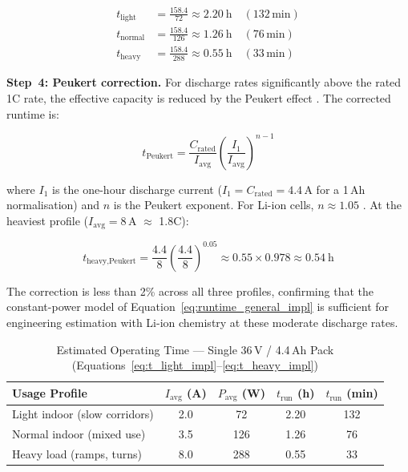 \documentclass[12pt,a4paper]{report}
\begin{document}
\begin{align}
  t_\text{light}  &= \frac{158.4}{72}  \approx \SI{2.20}{\hour}
  \quad (132\,\text{min})
  \label{eq:t_light_impl} \\[4pt]
  t_\text{normal} &= \frac{158.4}{126} \approx \SI{1.26}{\hour}
  \quad (76\,\text{min})
  \label{eq:t_normal_impl} \\[4pt]
  t_\text{heavy}  &= \frac{158.4}{288} \approx \SI{0.55}{\hour}
  \quad (33\,\text{min})
  \label{eq:t_heavy_impl}
\end{align}

\medskip
\noindent\textbf{Step~4: Peukert correction.}
For discharge rates significantly above the rated 1C rate, the
effective capacity is reduced by the Peukert effect \cite{peukert1897}.
The corrected runtime is:

\begin{equation}
  t_\text{Peukert} = \frac{C_\text{rated}}{I_\text{avg}}
  \left(\frac{I_1}{I_\text{avg}}\right)^{n-1}
  \label{eq:peukert_impl}
\end{equation}

where $I_1$ is the one-hour discharge current ($I_1 = C_\text{rated}
= 4.4$\,A for a 1\,Ah normalisation) and $n$ is the Peukert exponent.
For Li-ion cells, $n \approx 1.05$
\cite{hausmann2013improving, linden2011handbook}. At the heaviest
profile ($I_\text{avg} = 8$\,A $\approx$ 1.8C):

\begin{equation}
  t_\text{heavy,Peukert} = \frac{4.4}{8}
  \left(\frac{4.4}{8}\right)^{0.05}
  \approx 0.55 \times 0.978
  \approx \SI{0.54}{\hour}
  \label{eq:peukert_applied_impl}
\end{equation}

The correction is less than 2\% across all three profiles, confirming
that the constant-power model of Equation~\eqref{eq:runtime_general_impl}
is sufficient for engineering estimation with Li-ion chemistry at
these moderate discharge rates.

\begin{table}[H]
\centering
\caption{Estimated Operating Time — Single 36\,V / 4.4\,Ah Pack
  (Equations~\eqref{eq:t_light_impl}--\eqref{eq:t_heavy_impl})}
\label{tab:runtime_single_impl}
\begin{tabular}{@{}p{4.0cm} S[table-format=1.1]
                S[table-format=3.0] S[table-format=1.2]
                S[table-format=3.0]@{}}
\toprule
{}
\textbf{Usage Profile}
  & {$I_\text{avg}$ (A)}
  & {$P_\text{avg}$ (W)}
  & {$t_\text{run}$ (h)}
  & {$t_\text{run}$ (min)} \\
\midrule
Light indoor (slow corridors)      & 2.0 &  72 & 2.20 & 132 \\
Normal indoor (mixed use)          & 3.5 & 126 & 1.26 &  76 \\
Heavy load (ramps, turns)          & 8.0 & 288 & 0.55 &  33 \\
\bottomrule
\end{tabular}
\end{table}
\end{document}
